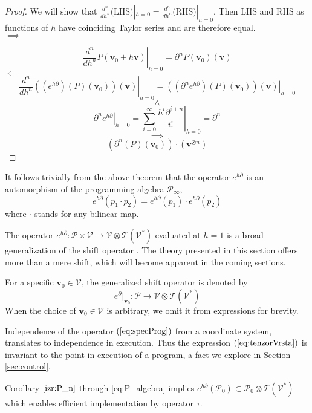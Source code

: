 \documentclass[11pt]{article}
\newcommand{\T}{\mathcal{T}}
\newcommand{\VV}{\mathcal{V}}
\newcommand{\vv}{\mathbf{v}}
\newcommand{\dP}{\mathcal{P}}
\newcommand{\D}{\partial}
\newcommand{\sumd}{\tau}
\begin{document}
 \begin{proof}
We will show that $\frac{d^n}{dh^n}\text{(LHS)}|_{h=0}=\frac{d^n}{dh^n}\text{(RHS)}|_{h=0}$. Then $\text{LHS}$ and $\text{RHS}$ as functions
of $h$ have coinciding Taylor series and are therefore equal.\\
 $\implies$
 
 $$\left. \frac{d^n}{dh^n}P(\vv_0+h\vv)\right|_{h=0}=\D^n P(\vv_0)(\vv)$$
 $\impliedby$
 $$\left. \frac{d^n}{dh^n}\left((e^{h\D})(P)(\vv_0)\right)(\vv)\right|_{h=0}=
\left. \left((\D^n e^{h\D})(P)(\vv_0)\right)(\vv)\right|_{h=0}$$
 $$\land$$
 $$\left. \D^ne^{h\D}\right| _{h=0}=\left. \sum\limits_{i=0}^{\infty}\frac{h^i\D^{i+n}}{i!}\right|_{h=0}=\D^n$$
 $$\implies$$
 $$\left(\D^n(P)(\vv_0)\right)\cdot(\vv^{\otimes n})$$
 \end{proof}
It follows trivially from the above theorem that the operator $e^{h\D}$ is an
automorphism of the programming algebra $\dP_\infty$, 
\begin{equation}\label{eq:prod}
 	e^{h\D}(p_1\cdot p_2)=e^{h\D}(p_1)\cdot e^{h\D}(p_2)
 \end{equation}
 where $\cdot$ stands for any bilinear map.

 \begin{remark}\label{rmrk:genShift}
 The operator $e^{h\D}:\dP\times \VV\to \VV\otimes \T(\VV^*)$ evaluated at $h=1$
 is a broad generalization of the shift operator \citep{OpCalc}. The theory
 presented in this section offers more than a mere shift, which will become
 apparent in the coming sections.
 \end{remark}
 
 For a specific $\vv_0\in\VV$, the generalized shift operator is denoted by
 \begin{equation*}
 e^\D\vert_{\vv_0}:\dP\to \VV\otimes \T(\VV^*)
 \end{equation*}
 When the choice of $\vv_0\in\VV$ is arbitrary, we omit it from expressions for brevity.

 \begin{remark}
 Independence of the operator $(\ref{eq:specProg})$ from a coordinate
 system, translates to independence in execution. Thus the expression
 $(\ref{eq:tenzorVrsta})$ is invariant to the point in execution of a program, a
 fact we explore in Section \ref{sec:control}.   
\end{remark}

 \begin{remark}
 Corollary $\ref{izr:P_n}$ through \eqref{eq:P_algebra} implies
      	$e^{h\D}(\dP_0)\subset\dP_0\otimes \T(\VV^*)$      
 which enables efficient implementation by operator $\sumd$. 
\end{remark}
\end{document}
